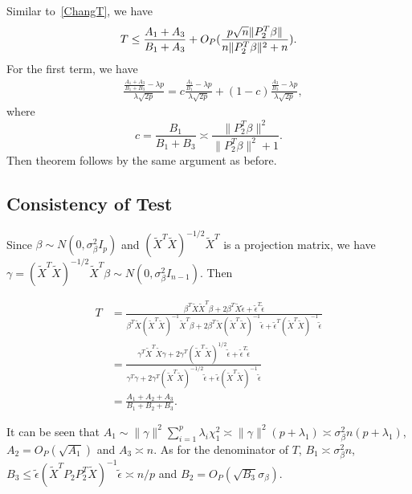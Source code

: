 \documentclass[review]{elsarticle}
\theoremstyle{plain}
\theoremstyle{definition}
\theoremstyle{remark}
\begin{document}
Similar to~\eqref{ChangT}, we have
\begin{equation}
            T\leq\frac{A_1+A_3}{B_1+A_3}+O_P(\frac{p\sqrt{n}\|P_2^T\beta\|}{n\|P_2^T\beta\|^2+n}).\\
\end{equation}
For the first term, we have
\begin{equation}
    \begin{aligned}
        &\frac{\frac{A_1+A_3}{B_1+B_3}-\lambda p}{\lambda \sqrt{2p}}
        =c\frac{\frac{A_1}{B_1}-\lambda p}{\lambda \sqrt{2p}}+
        (1-c)\frac{\frac{A_3}{B_3}-\lambda p}{\lambda \sqrt{2p}},
    \end{aligned}
\end{equation}
where 
\begin{equation}
    c=\frac{B_1}{B_1+B_3}\asymp \frac{\|P_2^T \beta\|^2}{\|P_2^T \beta\|^2+1}.
\end{equation}
Then theorem follows by the same argument as before.


\subsection{Consistency of Test}

Since $\beta\sim N(0,\sigma^2_{\beta}I_p)$ and ${(\tilde{X}^T \tilde{X})}^{-1/2}\tilde{X}^T$ is a projection matrix, we have $\gamma={(\tilde{X}^T \tilde{X})}^{-1/2}\tilde{X}^T\beta\sim N(0,\sigma^2_{\beta}I_{n-1})$. Then


\begin{equation}
    \begin{aligned}
        T&=\frac{\beta^T \tilde{X}\tilde{X}^T \beta+
        2\beta^T \tilde{X}\tilde{\epsilon}+
        \tilde{\epsilon}^T\tilde{\epsilon}
    }{\beta^T \tilde{X}{(\tilde{X}^T\tilde{X})}^{-1}\tilde{X}^T \beta+
        2\beta^T \tilde{X}{(\tilde{X}^T\tilde{X})}^{-1}\tilde{\epsilon}+
        \tilde{\epsilon}^T{(\tilde{X}^T\tilde{X})}^{-1}\tilde{\epsilon}
    }\\
        &=\frac{\gamma^T\tilde{X}^T\tilde{X}\gamma+2\gamma^T{(\tilde{X}^T\tilde{X})}^{1/2}\tilde{\epsilon}+\tilde{\epsilon}^T\tilde{\epsilon}}{\gamma^T\gamma+2\gamma^T{(\tilde{X}^T\tilde{X})}^{-1/2}\tilde{\epsilon}+\tilde{\epsilon}{(\tilde{X}^T\tilde{X})}^{-1}\tilde{\epsilon}}\\
        &=\frac{A_1+A_2+A_3}{B_1+B_2+B_3}.
    \end{aligned}
\end{equation}

It can be seen that
$A_1\sim \|\gamma\|^2\sum_{i=1}^{p}\lambda_i \chi^2_1\asymp \|\gamma\|^2 (p+\lambda_1)\asymp \sigma^2_\beta n(p+\lambda_1)$, $A_2=O_P(\sqrt{A_1})$ and $A_3\asymp n$. As for the denominator of $T$, $B_1\asymp \sigma^2_\beta n$, $B_3 \leq \tilde{\epsilon}{(\tilde{X}^T P_2 P_2^T\tilde{X})}^{-1}\tilde{\epsilon}\asymp n/p$ and $B_2=O_P(\sqrt{B_3}\sigma_\beta)$.
\end{document}
